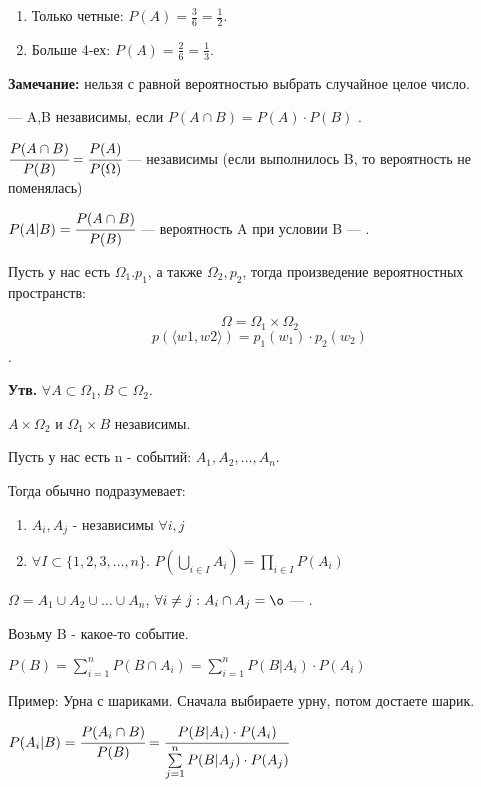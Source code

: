 \begin{enumerate}
\item Только четные: $P(A) = \frac{3}{6}=\frac{1}{2}$.
\item Больше 4-ех: $P(A) = \frac{2}{6}=\frac{1}{3}$.
\end{enumerate}

\textbf{Замечание:} нельзя с равной вероятностью выбрать случайное целое число. 

 --- A,B независимы, если $P(A \cap B) = P(A) \cdot P(B)$ .

$\cfrac{P(A \cap B)}{ P(B)}  = \cfrac{P(A)}{P(\Omega)}$ --- независимы (если выполнилось B, то вероятность не поменялась)

$P(A | B) = \cfrac{P(A \cap B)}{P(B)}$ --- вероятность A при условии B ---
.


Пусть у нас есть $\Omega_1. p_1$, а также $\Omega_2,p_2$, тогда произведение вероятностных пространств:

\[\Omega = \Omega_1 \times \Omega_2\] \[p(\langle w1,w2\rangle) = p_1(w_1) \cdot p_2(w_2)\].

\textbf{Утв.} $\forall A \subset \Omega_1, B \subset \Omega_2$.

$A \times \Omega_2 $ и $\Omega_1 \times B $  независимы.

Пусть у нас есть n - событий: $A_1, A_2, \ldots, A_n$.

Тогда обычно  подразумевает:

\begin{enumerate}
    \item $A_i, A_j $ - независимы $\forall i,j$
    \item $\forall I \subset \{1,2,3,\ldots, n\}$. $P(\bigcup\limits_{i \in I }A_i) = \prod\limits_{i \in I} P(A_i)$
\end{enumerate}


$\Omega = A_1 \cup A_2 \cup \ldots \cup A_n $, $\forall i \neq j: A_i \cap A_j = \o$ --- .

Возьму B - какое-то событие.

$P(B) = \sum\limits_{i=1}^n P(B \cap A_i) =  \sum\limits_{i=1}^n P(B| A_i) \cdot P(A_i)$

Пример: Урна с шариками. Сначала выбираете урну, потом достаете шарик.


$P(A_i | B) = \cfrac{P(A_i\cap B)}{P(B)} = \cfrac{P(B| A_i) \cdot P(A_i)}{\sum\limits_{j=1}^n P(B| A_j) \cdot P(A_j)}$


